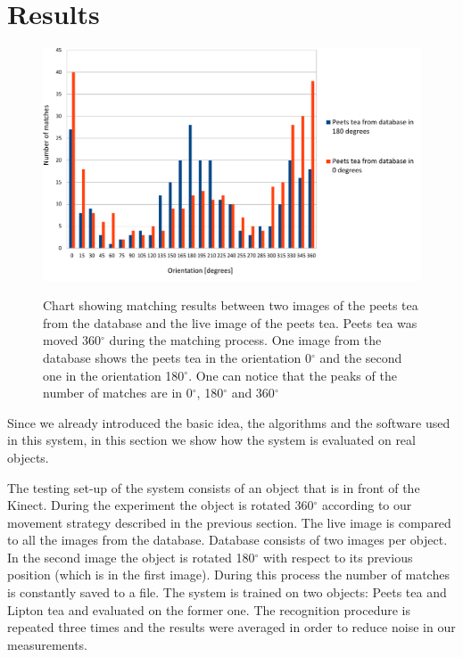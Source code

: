 \section{Results}

\begin{figure}

\includegraphics[width=1.3\columnwidth]{figures/print2.pdf}\\


\caption{Chart showing matching results between two images of the peets tea from the database and the live image of the peets tea. Peets tea was moved 360$^\circ$ during the matching process. One image from the database shows the peets tea in the orientation 0$^\circ$ and the second one in the orientation 180$^\circ$. One can notice that the peaks of the number of matches are in 0$^\circ$, 180$^\circ$ and 360$^\circ$}
\label{fig:recognition-results}
\end{figure}
Since we already introduced the basic idea, the algorithms and the software used in this system, in this section we show how the system is evaluated on real objects.

The testing set-up of the system consists of an object that is in front of the Kinect. During the experiment the object is rotated 360$^\circ$ according to our movement strategy described in the previous section. The live image is compared to all the images from the database. Database consists of two images per object. In the second image the object is rotated 180$^\circ$ with respect to its previous position (which is in the first image). During this process the number of matches is constantly saved to a file. The system is trained on two objects: Peets tea and Lipton tea and evaluated on the former one. The recognition procedure is repeated three times and the results were averaged in order to reduce noise in our measurements. 

